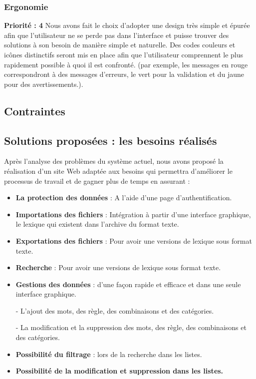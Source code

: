 \documentclass[12pt,a4paper]{article}
\begin{document}
\subsubsection{Ergonomie}
\textbf{Priorité : 4}
\smallbreak
Nous avons fait le choix d'adopter une design très simple et épurée afin que l'utilisateur ne se perde pas dans l'interface et puisse trouver des solutions à son besoin de manière simple et naturelle.
\smallbreak
Des codes couleurs et icônes distinctifs seront mis en place afin que l'utilisateur comprennent le plus rapidement possible à quoi il est confronté. (par exemple, les messages en rouge correspondront à des messages d'erreurs, le vert pour la validation et du jaune pour des avertissements.).

\subsection{Contraintes}

\subsection{Solutions proposées : les besoins réalisés}

Après l'analyse des problèmes du système actuel, nous avons proposé la réalisation d'un site Web  adaptée aux besoins 
qui permettra d'améliorer le processus de travail et de gagner plus de temps en assurant :

\begin{itemize}
\item \textbf{La protection des données } : A l'aide d'une page d'authentification.
\item \textbf{Importations des fichiers} : Intégration à partir d'une interface graphique, le lexique qui existent dans l'archive du format texte.
\item \textbf{Exportations des fichiers} : Pour avoir une versions de lexique sous format texte.
\item \textbf{Recherche} : Pour avoir une versions de lexique sous format texte.
\item \textbf{Gestions des données} : d'une façon rapide et efficace et dans une seule interface graphique.


- L'ajout des mots, des règle, des combinaisons et des catégories.


- La modification et la suppression des mots, des règle, des combinaisons et des catégories.
\item \textbf{Possibilité du filtrage} : lors de la recherche dans les listes.
\item \textbf{Possibilité de la modification et suppression dans les listes.}
\end{itemize}
\end{document}
